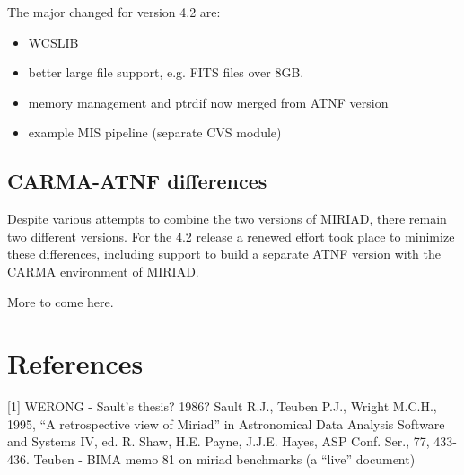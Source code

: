 The major changed for version 4.2 are:

\begin{itemize}
\item
WCSLIB
\item
better large file support, e.g. FITS files over 8GB.
\item
memory management and ptrdif now merged from ATNF version
\item
example MIS pipeline (separate CVS module)

\end{itemize}

\subsection{CARMA-ATNF differences}

Despite various attempts to combine the two versions of MIRIAD, there 
remain two different versions. For the 4.2 release a renewed effort
took place to minimize these differences, including support to build
a separate ATNF version with the CARMA environment of MIRIAD.

More to come here.

\section*{References}

[1] WERONG - Sault's thesis? 1986?
\newline
[2] Sault R.J., Teuben P.J., Wright M.C.H., 1995,
 ``A retrospective view of Miriad'' in 
Astronomical Data Analysis Software and Systems IV, 
ed. R. Shaw, H.E. Payne, J.J.E. Hayes, ASP Conf. Ser., 77, 433-436.
\newline
[3] Teuben - BIMA memo 81 on miriad benchmarks (a ``live'' document)
\newline


